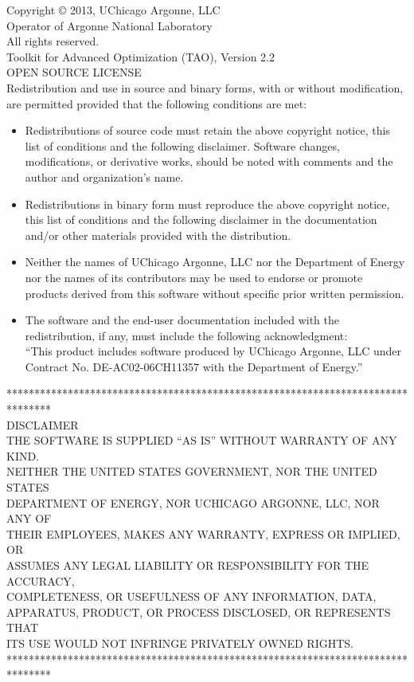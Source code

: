 \noindent
Copyright © 2013, UChicago Argonne, LLC \\
Operator of Argonne National Laboratory \\
All rights reserved. \\
Toolkit for Advanced Optimization (TAO), Version 2.2 \\
OPEN SOURCE LICENSE \\

\noindent
Redistribution and use in source and binary forms, with or without modification, are permitted provided that the following conditions are met:
\begin{itemize}
\item    Redistributions of source code must retain the above copyright notice, this list of conditions and the following disclaimer. Software changes, modifications, or derivative works, should be noted with comments and the author and organization's name. \\
\item    Redistributions in binary form must reproduce the above copyright notice, this list of conditions and the following disclaimer in the documentation and/or other materials provided with the distribution. \\
\item    Neither the names of UChicago Argonne, LLC nor the Department of Energy nor the names of its contributors may be used to endorse or promote products derived from this software without specific prior written permission. \\
\item    The software and the end-user documentation included with the redistribution, if any, must include the following acknowledgment:\\
    ``This product includes software produced by UChicago Argonne, LLC under Contract No. DE-AC02-06CH11357 with the Department of Energy.''
\end{itemize}

\noindent
********************************************************************************\\
\noindent
DISCLAIMER \\

\noindent
THE SOFTWARE IS SUPPLIED ``AS IS'' WITHOUT WARRANTY OF ANY KIND.\\
NEITHER THE UNITED STATES GOVERNMENT, NOR THE UNITED STATES\\
DEPARTMENT OF ENERGY, NOR UCHICAGO ARGONNE, LLC, NOR ANY OF\\
THEIR EMPLOYEES, MAKES ANY WARRANTY, EXPRESS OR IMPLIED, OR\\
ASSUMES ANY LEGAL LIABILITY OR RESPONSIBILITY FOR THE ACCURACY,\\
COMPLETENESS, OR USEFULNESS OF ANY INFORMATION, DATA,\\
APPARATUS, PRODUCT, OR PROCESS DISCLOSED, OR REPRESENTS THAT\\
ITS USE WOULD NOT INFRINGE PRIVATELY OWNED RIGHTS.\\

\noindent
********************************************************************************\\
